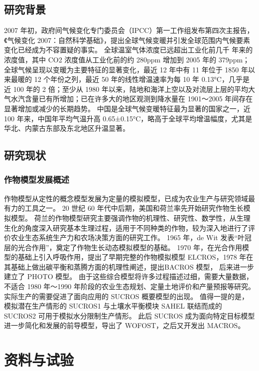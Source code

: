 \documentclass[degree=bachelor]{thuthesis}
\begin{document}
\section{研究背景}

2007 年初，政府间气候变化专门委员会（IPCC）第一工作组发布第四次主报告，《气候变化 2007：自然科学基础》，提出全球气候变暖并引发全球范围内气候要素变化已经成为不容置疑的事实\cite{xinximeng1994xinxi}。
全球温室气体浓度已远超出工业化前几千 年来的浓度值，其中 CO2 浓度值从工业化前的约 280ppm 增加到 2005 年的 379ppm；全球气候呈现以变暖为主要特征的显著变化，最近 12 年中有 11 年位于 1850 年以来最暖的 12 个年份之列，最近 50 年的线性增温速率为每 10 年 0.13°C，几乎是近 100 年的 2 倍；至少从 1980 年以来，陆地和海洋上空以及对流层上层的平均大气水汽含量已有所增加；已在许多大的地区观测到降水量在 1901～2005 年间存在显著增加或减少的长期趋势。
中国是全球气候变暖特征最为显著的国家之一，近 100 年来，中国年平均气温升高 0.65±0.15°C，略高于全球平均增温幅度，尤其是华北、内蒙古东部及东北地区升温显著。


\section{研究现状}

\subsection{作物模型发展概述}

作物模型从定性的概念模型发展为定量的模拟模型，已成为农业生产与研究领域最有力的工具之一。
20 世纪 60 年代中后期，美国和荷兰率先开始研究作物生长模拟模型。
荷兰的作物模型研究主要强调作物的机理性、研究性、数学性，从生理生化的角度深入研究基本生理过程，适用于不同种类的作物，较为深入地进行了评价农业生态系统生产力和农场决策方面的研究工作。
1965 年，de Wit 发表“叶冠层的光合作用”，奠定了作物生长动态模拟模型的基础。
1970 年，在光合作用模型的基础上引入呼吸作用，提出了早期完整的作物模拟模型 ELCROS，1978 年在其基础上做出碳平衡和蒸腾方面的机理性阐述，提出BACROS 模型， 后来进一步建立了 PHOTO 模型。
由于这些综合模型将许多过程描述过细，需要大量数据，不适合 1980 年～1990 年阶段的农业生态规划、定量土地评价和产量预报等研究。
实际生产的需要促进了面向应用的 SUCROS 概要模型的出现。
值得一提的是，模拟潜在生产情形的 SUCROS1 与土壤水平衡模块 SAHEL 联结而成的 SUCROS2 可用于模拟水分限制生产情形。
此后 SUCROS 成为面向特定目标模型 进一步简化和发展的前导模型，导出了 WOFOST，之后又开发出 MACROS。



\chapter{资料与试验}
\end{document}
